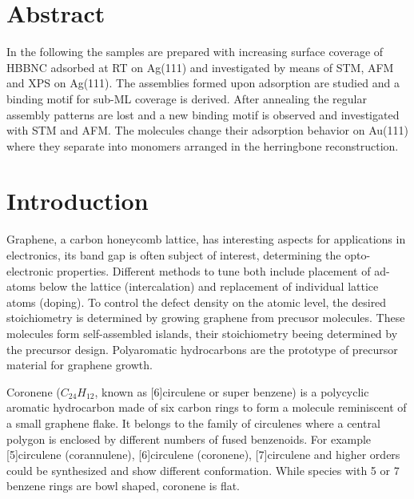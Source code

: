 \label{section:HBBNC}
\label{section:HBC}
\section{Abstract}
In the following the samples are prepared with increasing surface coverage of HBBNC adsorbed at RT on Ag(111) and investigated by means of STM, AFM and XPS on Ag(111). The assemblies formed upon adsorption are studied and a binding motif for sub-ML coverage is derived. After annealing the regular assembly patterns are lost and a new binding motif is observed and investigated with STM and AFM. The molecules change their adsorption behavior on Au(111) where they separate into monomers arranged in the herringbone reconstruction.

\section{Introduction}
Graphene, a carbon honeycomb lattice, has interesting aspects for applications in electronics, its band gap is often subject of interest, determining the opto-electronic properties. Different methods to tune both include placement of ad-atoms below the lattice (intercalation) and replacement of individual lattice atoms (doping). To control the defect density on the atomic level, the desired stoichiometry is determined by growing graphene from precusor molecules. These molecules form self-assembled islands, their stoichiometry beeing determined by the precursor design. Polyaromatic hydrocarbons are the prototype of precursor material for graphene growth. 

Coronene ($C_{24}H_{12}$, known as [6]circulene or super benzene) is a polycyclic aromatic hydrocarbon made of six carbon rings to form a molecule reminiscent of a small graphene flake. It belongs to the family of circulenes where a central polygon is enclosed by different numbers of fused benzenoids. For example [5]circulene (corannulene), [6]circulene (coronene), [7]circulene and higher orders could be synthesized and show different conformation. While species with 5 or 7 benzene rings are bowl shaped, coronene is flat.

